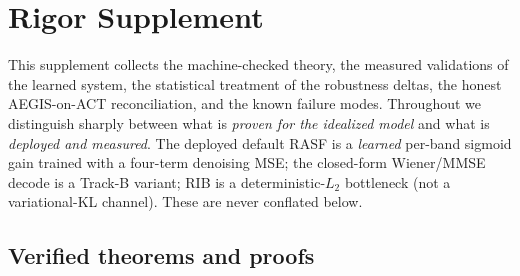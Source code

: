 \section{Rigor Supplement}
\label{sec:rigor-supplement}

This supplement collects the machine-checked theory, the measured validations of
the learned system, the statistical treatment of the robustness deltas, the
honest AEGIS-on-ACT reconciliation, and the known failure modes. Throughout we
distinguish sharply between what is \emph{proven for the idealized model} and
what is \emph{deployed and measured}. The deployed default RASF is a
\emph{learned} per-band sigmoid gain trained with a four-term denoising MSE; the
closed-form Wiener/MMSE decode is a Track-B variant; RIB is a deterministic-$L_2$
bottleneck (not a variational-KL channel). These are never conflated below.

\subsection{Verified theorems and proofs}

